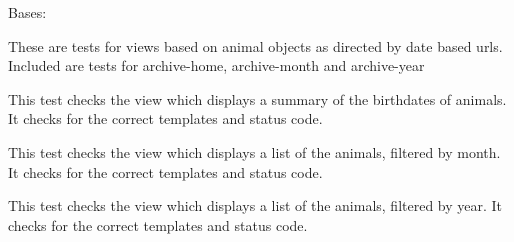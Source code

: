 \documentclass[letterpaper,10pt,english]{sphinxmanual}
\begin{document}

\begin{fulllineitems}
\label{api:mousedb.animal.tests.DateViewTests}
Bases: 

These are tests for views based on animal objects as directed by date based urls.  Included are tests for archive-home, archive-month and archive-year


\begin{fulllineitems}
\label{api:mousedb.animal.tests.DateViewTests.setUp}
\end{fulllineitems}



\begin{fulllineitems}
\label{api:mousedb.animal.tests.DateViewTests.tearDown}
\end{fulllineitems}



\begin{fulllineitems}
\label{api:mousedb.animal.tests.DateViewTests.test_archive_home}
This test checks the view which displays a summary of the birthdates of animals.  It checks for the correct templates and status code.

\end{fulllineitems}



\begin{fulllineitems}
\label{api:mousedb.animal.tests.DateViewTests.test_archive_month}
This test checks the view which displays a list of the animals, filtered by month.  It checks for the correct templates and status code.

\end{fulllineitems}



\begin{fulllineitems}
\label{api:mousedb.animal.tests.DateViewTests.test_archive_year}
This test checks the view which displays a list of the animals, filtered by year.  It checks for the correct templates and status code.

\end{fulllineitems}


\end{fulllineitems}
\end{document}
